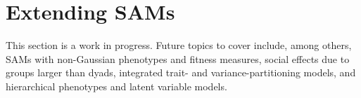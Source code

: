\documentclass[
]{book}
\newenvironment{Shaded}{\begin{snugshade}}{\end{snugshade}}
\newcommand{\CommentTok}[1]{\textcolor[rgb]{0.56,0.35,0.01}{\textit{#1}}}
\newcommand{\ControlFlowTok}[1]{\textcolor[rgb]{0.13,0.29,0.53}{\textbf{#1}}}
\newcommand{\DataTypeTok}[1]{\textcolor[rgb]{0.13,0.29,0.53}{#1}}
\newcommand{\DecValTok}[1]{\textcolor[rgb]{0.00,0.00,0.81}{#1}}
\newcommand{\KeywordTok}[1]{\textcolor[rgb]{0.13,0.29,0.53}{\textbf{#1}}}
\newcommand{\NormalTok}[1]{#1}
\newcommand{\OperatorTok}[1]{\textcolor[rgb]{0.81,0.36,0.00}{\textbf{#1}}}
\newcommand{\OtherTok}[1]{\textcolor[rgb]{0.56,0.35,0.01}{#1}}
\newcommand{\StringTok}[1]{\textcolor[rgb]{0.31,0.60,0.02}{#1}}
\begin{document}
\begin{Shaded}
\end{Shaded}

\hypertarget{extending-sams}{%
\chapter{Extending SAMs}\label{extending-sams}}

This section is a work in progress. Future topics to cover include, among others, SAMs with non-Gaussian phenotypes and fitness measures, social effects due to groups larger than dyads, integrated trait- and variance-partitioning models, and hierarchical phenotypes and latent variable models.

  
\end{document}
